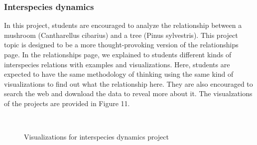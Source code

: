 \documentclass{article}
\begin{document}
\subsubsection{Interspecies dynamics}
In this project, students are encouraged to analyze the relationship between a mushroom (Cantharellus cibarius) and a tree (Pinus sylvestris). This project topic is designed to be a more thought-provoking version of the relationships page. In the relationships page, we explained to students different kinds of interspecies relations with examples and visualizations. Here, students are expected to have the same methodology of thinking using the same kind of visualizations to find out what the relationship here. They are also encouraged to search the web and download the data to reveal more about it. The visualzations of the projects are provided in Figure 11.
\begin{figure}[h]
	\centering
	\\
	\vspace*{-2mm}
	\caption{Visualizations for interspecies dynamics project}
\end{figure}
\end{document}
